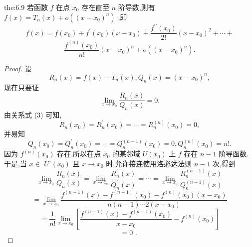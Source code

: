 \begin{theorem}{}{the:6.9}
若函数 \(f\) 在点 \({x}_{0}\) 存在直至 \(n\) 阶导数,则有 \(f\left( x\right)  = {T}_{n}\left( x\right)  + o\left( {\left( x - {x}_{0}\right) }^{n}\right)\) ,即
\[
f\left( x\right)  = f\left( {x}_{0}\right)  + {f}^{\prime }\left( {x}_{0}\right) \left( {x - {x}_{0}}\right)  + \frac{{f}^{\prime \prime }\left( {x}_{0}\right) }{2!}{\left( x - {x}_{0}\right) }^{2} + \cdots  +
\]
\[
\frac{{f}^{\left( n\right) }\left( {x}_{0}\right) }{n!}{\left( x - {x}_{0}\right) }^{n} + o\left( {\left( x - {x}_{0}\right) }^{n}\right) . \tag{4}
\]
\end{theorem}

\begin{proof}
设
\[
{R}_{n}\left( x\right)  = f\left( x\right)  - {T}_{n}\left( x\right) ,{Q}_{n}\left( x\right)  = {\left( x - {x}_{0}\right) }^{n},
\]
现在只要证
\[
\mathop{\lim }\limits_{{x \rightarrow  {x}_{0}}}\frac{{R}_{n}\left( x\right) }{{Q}_{n}\left( x\right) } = 0.
\]
由关系式 (3) 可知,
\[
{R}_{n}\left( {x}_{0}\right)  = {R}_{n}^{\prime }\left( {x}_{0}\right)  = \cdots  = {R}_{n}^{\left( n\right) }\left( {x}_{0}\right)  = 0,
\]
并易知
\[
{Q}_{n}\left( {x}_{0}\right)  = {Q}_{n}^{\prime }\left( {x}_{0}\right)  = \cdots  = {Q}_{n}^{\left( n - 1\right) }\left( {x}_{0}\right)  = 0,{Q}_{n}^{\left( n\right) }\left( {x}_{0}\right)  = n!.
\]
因为 \({f}^{\left( n\right) }\left( {x}_{0}\right)\) 存在,所以在点 \({x}_{0}\) 的某邻域 \(U\left( {x}_{0}\right)\) 上 \(f\) 存在 \(n - 1\) 阶导函数. 于是,当 \(x \in\)  \({U}^{ \circ  }\left( {x}_{0}\right)\) 且 \(x \rightarrow  {x}_{0}\) 时,允许接连使用洛必达法则 \(n - 1\) 次,得到
\[
\mathop{\lim }\limits_{{x \rightarrow  {x}_{0}}}\frac{{R}_{n}\left( x\right) }{{Q}_{n}\left( x\right) } = \mathop{\lim }\limits_{{x \rightarrow  {x}_{0}}}\frac{{R}_{n}^{\prime }\left( x\right) }{{Q}_{n}^{\prime }\left( x\right) } = \cdots  = \mathop{\lim }\limits_{{x \rightarrow  {x}_{0}}}\frac{{R}_{n}^{\left( n - 1\right) }\left( x\right) }{{Q}_{n}^{\left( n - 1\right) }\left( x\right) }
\]
\[
= \mathop{\lim }\limits_{{x \rightarrow  {x}_{0}}}\frac{{f}^{\left( n - 1\right) }\left( x\right)  - {f}^{\left( n - 1\right) }\left( {x}_{0}\right)  - {f}^{\left( n\right) }\left( {x}_{0}\right) \left( {x - {x}_{0}}\right) }{n\left( {n - 1}\right) \cdots 2\left( {x - {x}_{0}}\right) }
\]
\[
= \frac{1}{n!}\mathop{\lim }\limits_{{x \rightarrow  {x}_{0}}}\left\lbrack  {\frac{{f}^{\left( n - 1\right) }\left( x\right)  - {f}^{\left( n - 1\right) }\left( {x}_{0}\right) }{x - {x}_{0}} - {f}^{\left( n\right) }\left( {x}_{0}\right) }\right\rbrack
\]
\[
= 0\text{ . }
\]
\end{proof}

